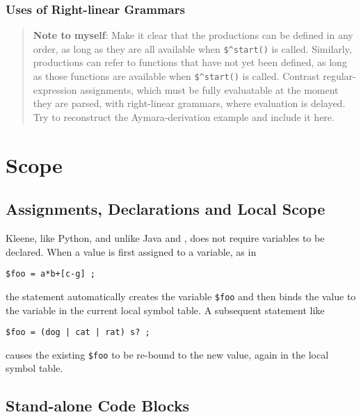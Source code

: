 \subsubsection{Uses of Right-linear Grammars}

\begin{quote}
\textbf{Note to myself}:   Make it clear that the productions can be defined in any order, as long as they
are all available when \verb!$^start()! is called. Similarly,
productions can refer to functions that have not yet been defined,
as long as those functions are available when \verb!$^start()! is
called.  Contrast
regular-expression assignments, which must be fully evaluatable at the
moment they are parsed, with right-linear grammars, where
evaluation is delayed.
Try to reconstruct the Aymara-derivation example and include it here.  
\end{quote}



\section{Scope}

\subsection{Assignments, Declarations and Local Scope}

Kleene, like Python, and unlike Java and \CPP{}, does not require
variables to be declared.
When a value is first assigned to a variable, as in

\begin{Verbatim}
$foo = a*b+[c-g] ;
\end{Verbatim}

\noindent
the statement automatically creates the variable \verb!$foo! and then binds
the \fsm{} value to the variable in the current local symbol table.  A
subsequent statement like

\begin{Verbatim}
$foo = (dog | cat | rat) s? ;
\end{Verbatim}

\noindent
causes the existing \verb!$foo! to be re-bound to the new \fsm{} 
value, again in the local symbol table.


\subsection{Stand-alone Code Blocks}

